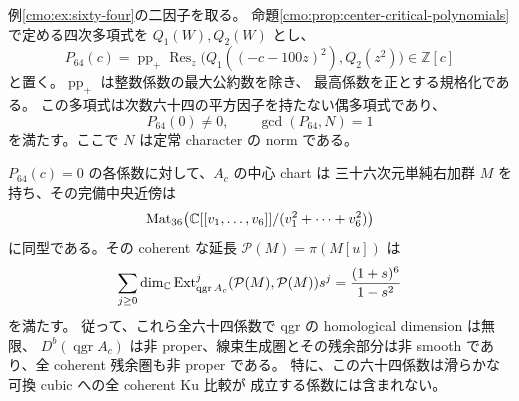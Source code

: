 \begin{theorem}
\label{cmo:thm:morse-singular-sixty-four}
例\ref{cmo:ex:sixty-four}の二因子を取る。
命題\ref{cmo:prop:center-critical-polynomials}で定める四次多項式を $Q_1(W),Q_2(W)$ とし、
\begin{equation}\label{cmo:eq:morse-resultant}
 P_{64}(c)=\operatorname{pp}_+
   \operatorname{Res}_{z}\bigl(Q_1((-c-100z)^2),Q_2(z^2)\bigr)
       \in\mathbb Z[c]
\end{equation}
と置く。$\operatorname{pp}_+$ は整数係数の最大公約数を除き、
最高係数を正とする規格化である。
この多項式は次数六十四の平方因子を持たない偶多項式であり、
\[
 P_{64}(0)\ne0,\qquad \gcd(P_{64},N)=1
\]
を満たす。ここで $N$ は定常 character の norm である。

$P_{64}(c)=0$ の各係数に対して、$A_c$ の中心 chart は
三十六次元単純右加群 $M$ を持ち、その完備中央近傍は
\begin{equation}\label{cmo:eq:morse-matrix-node}
 \operatorname{Mat}_{36}\!\left(
   \mathbb C[[v_1,\ldots,v_6]]/(v_1^2+\cdots+v_6^2)\right)
\end{equation}
に同型である。その coherent な延長 $\mathcal P(M)=\pi(M[u])$ は
\begin{equation}\label{cmo:eq:morse-self-ext}
 \sum_{j\ge0}\dim_\mathbb C\operatorname{Ext}_{\operatorname{qgr}A_c}^j
       (\mathcal P(M),\mathcal P(M))s^j
       =\frac{(1+s)^6}{1-s^2}
\end{equation}
を満たす。
従って、これら全六十四係数で qgr の homological dimension は無限、
$D^b(\operatorname{qgr}A_c)$ は非 proper、線束生成圏とその残余部分は非 smooth であり、全 coherent 残余圏も非 proper である。
特に、この六十四係数は滑らかな可換 cubic への全 coherent Ku 比較が
成立する係数には含まれない。
\end{theorem}
